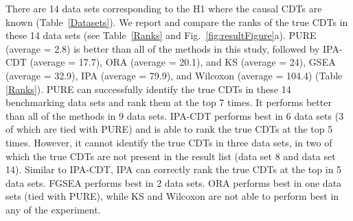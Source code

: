 There are 14 data sets corresponding to the H1 where the causal CDTs are known (Table~\ref{Datasets}). We report and compare the ranks of the true CDTs in these 14 data sets (see Table~\ref{Ranks} and Fig.~\ref{fig:resultFigure}a).
PURE (average = 2.8) is better than all of the methods in this study, followed by IPA-CDT (average = 17.7), ORA (average = 20.1), and KS (average = 24), GSEA (average = 32.9), IPA (average = 79.9), and Wilcoxon (average = 104.4) (Table \ref{Ranks}). PURE can successfully identify the true CDTs in these 14 benchmarking data sets and rank them at the top 7 times. It performs better than all of the methods in 9 data sets. IPA-CDT performs best in 6 data sets (3 of which are tied with PURE) and is able to rank the true CDTs at the top 5 times. However, it cannot identify the true CDTs in three data sets, in two of which the true CDTs are not present in the result list (data set 8 and data set 14). Similar to IPA-CDT, IPA can correctly rank the true CDTs at the top in 5 data sets.  FGSEA performs best in 2 data sets. ORA performs best in one data sets (tied with PURE), while KS and Wilcoxon are not able to perform best in any of the experiment.


